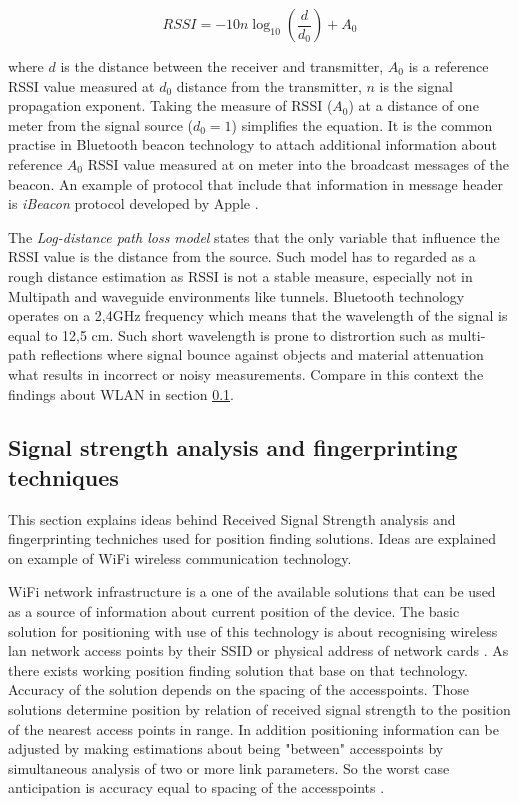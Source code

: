 \documentclass[../main.tex]{subfiles}
\begin{document}
\begin{equation}
\label{eq:log-distance-model}
	RSSI = -10 n \log_{10} (\frac{d}{d_0}) + A_0
\end{equation}

where $ d $ is the distance between the receiver and transmitter, $A_0$ is a reference RSSI value measured at $d_0$ distance from the transmitter, $n$ is the signal propagation exponent. Taking the measure of RSSI ($A_0$) at a distance of one meter from the signal source ($d_0 = 1$) simplifies the equation. It is the common practise in Bluetooth beacon technology to attach additional information about reference $A_0$ RSSI value measured at on meter into the broadcast messages of the beacon. An example of protocol that include that information in message header is \textit{iBeacon} protocol developed by Apple \cite{beacons_ble_evaluation}.

The \textit{Log-distance path loss model} states that the only variable that influence the RSSI value is the distance from the source. Such model has to regarded as a rough distance estimation as RSSI is not a stable measure, especially not in Multipath and waveguide environments like tunnels. Bluetooth technology operates on a 2,4GHz frequency which means that the wavelength of the signal is equal to 12,5 cm. Such short wavelength is prone to distrortion such as multi-path reflections where signal bounce against objects and material attenuation what results in incorrect or noisy measurements\cite{RSSI_path_loss_prediction_model}. Compare in this context the findings about WLAN in section \ref{sub:wifi_fingerprinting}.


\subsection{Signal strength analysis and fingerprinting techniques} %
\label{sub:wifi_fingerprinting}

This section explains ideas behind Received Signal Strength analysis and fingerprinting techniches used for position finding solutions. Ideas are explained on example of WiFi wireless communication technology.

WiFi network infrastructure is a one of the available solutions that can be used as a source of information about current position of the device. The basic solution for positioning with use of this technology is about recognising wireless lan network access points by their SSID or physical address of network cards \cite{WLAN_fingerprinting}. As there exists working position finding solution that base on that technology. Accuracy of the solution depends on the spacing of the accesspoints. Those solutions determine position by relation of received signal strength to the position of the nearest access points in range. In addition positioning information can be adjusted by making estimations about being "between" accesspoints by simultaneous analysis of two or more link parameters. So the worst case anticipation is accuracy equal to spacing of the accesspoints \cite{Thesis_CM}\cite{thesis_tablet_positioning}.
\end{document}
